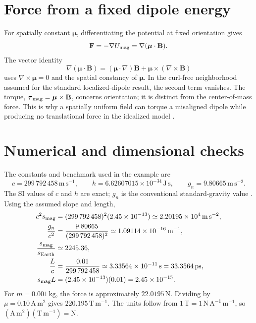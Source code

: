 \documentclass[12pt]{article}
\begin{document}
\appendix

\section{Force from a fixed dipole energy}
\label{app:force-derivation}

For spatially constant $\boldsymbol{\mu}$, differentiating the potential at fixed orientation gives
\begin{equation}
  \mathbf F=-\nabla U_{\rm mag}
  =\nabla(\boldsymbol{\mu}\cdot\mathbf B).
  \label{eq:app-force-gradient}
\end{equation}
The vector identity
\begin{equation}
  \nabla(\boldsymbol{\mu}\cdot\mathbf B)
  =(\boldsymbol{\mu}\cdot\nabla)\mathbf B
    +\boldsymbol{\mu}\times(\nabla\times\mathbf B)
  \label{eq:app-vector-identity}
\end{equation}
uses $\nabla\times\boldsymbol{\mu}=0$ and the spatial constancy of $\boldsymbol{\mu}$. In the curl-free neighborhood assumed for the standard localized-dipole result, the second term vanishes. The torque, $\boldsymbol{\tau}_{\rm mag}=\boldsymbol{\mu}\times\mathbf B$, concerns orientation; it is distinct from the center-of-mass force. This is why a spatially uniform field can torque a misaligned dipole while producing no translational force in the idealized model \cite{TongDipole}.

\section{Numerical and dimensional checks}
\label{app:numerical-checks}

The constants and benchmark used in the example are
\begin{equation}
  c=299\,792\,458\,\mathrm{m\,s^{-1}},
  \qquad
  h=6.62607015\times10^{-34}\,\mathrm{J\,s},
  \qquad
  g_n=9.80665\,\mathrm{m\,s^{-2}}.
  \label{eq:app-constants}
\end{equation}
The SI values of $c$ and $h$ are exact; $g_n$ is the conventional standard-gravity value \cite{JCGM}. Using the assumed slope and length,
\begin{align}
  c^2s_{\rm mag}
    &=(299\,792\,458)^2(2.45\times10^{-13})
      \simeq2.20195\times10^4\,\mathrm{m\,s^{-2}},\\
  \frac{g_n}{c^2}
    &=\frac{9.80665}{(299\,792\,458)^2}
      \simeq1.09114\times10^{-16}\,\mathrm{m^{-1}},\\
  \frac{s_{\rm mag}}{s_{\rm Earth}}&\simeq2245.36,\\
  \frac{L}{c}
    &=\frac{0.01}{299\,792\,458}
      \simeq3.33564\times10^{-11}\,\mathrm s
      =33.3564\,\mathrm{ps},\\
  s_{\rm mag}L
    &=(2.45\times10^{-13})(0.01)
      =2.45\times10^{-15}.
  \label{eq:app-numerical-values}
\end{align}
For $m=0.001\,\mathrm{kg}$, the force is approximately $22.0195\,\mathrm N$. Dividing by $\mu=0.10\,\mathrm{A\,m^2}$ gives $220.195\,\mathrm{T\,m^{-1}}$. The units follow from $1\,\mathrm T=1\,\mathrm{N\,A^{-1}\,m^{-1}}$, so $(\mathrm{A\,m^2})(\mathrm{T\,m^{-1}})=\mathrm N$.
\end{document}
